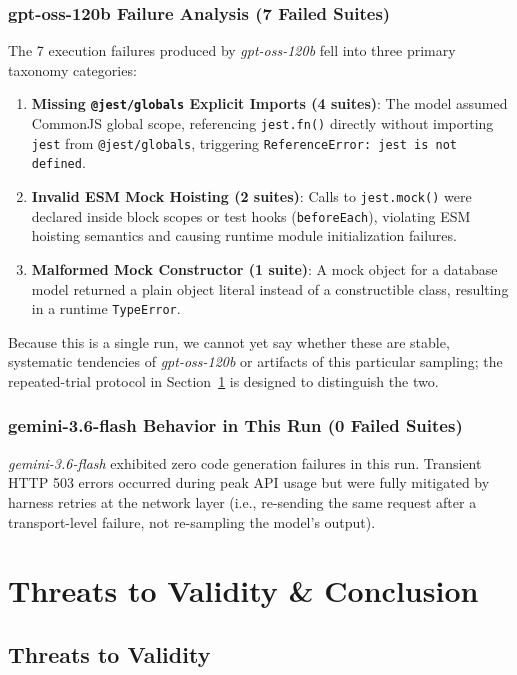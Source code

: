 \documentclass[conference]{IEEEtran}
\begin{document}
\subsubsection{gpt-oss-120b Failure Analysis (7 Failed Suites)}
The 7 execution failures produced by \textit{gpt-oss-120b} fell into three primary taxonomy categories:
\begin{enumerate}
    \item \textbf{Missing \texttt{@jest/globals} Explicit Imports (4 suites)}: The model assumed CommonJS global scope, referencing \texttt{jest.fn()} directly without importing \texttt{jest} from \texttt{@jest/globals}, triggering \texttt{ReferenceError: jest is not defined}.
    \item \textbf{Invalid ESM Mock Hoisting (2 suites)}: Calls to \texttt{jest.mock()} were declared inside block scopes or test hooks (\texttt{beforeEach}), violating ESM hoisting semantics and causing runtime module initialization failures.
    \item \textbf{Malformed Mock Constructor (1 suite)}: A mock object for a database model returned a plain object literal instead of a constructible class, resulting in a runtime \texttt{TypeError}.
\end{enumerate}
Because this is a single run, we cannot yet say whether these are stable, systematic tendencies of \textit{gpt-oss-120b} or artifacts of this particular sampling; the repeated-trial protocol in Section~\ref{sec:threats} is designed to distinguish the two.

\subsubsection{gemini-3.6-flash Behavior in This Run (0 Failed Suites)}
\textit{gemini-3.6-flash} exhibited zero code generation failures in this run. Transient HTTP 503 errors occurred during peak API usage but were fully mitigated by harness retries at the network layer (i.e., re-sending the same request after a transport-level failure, not re-sampling the model's output).

\section{Threats to Validity \& Conclusion}
\label{sec:threats}

\subsection{Threats to Validity}
\end{document}
